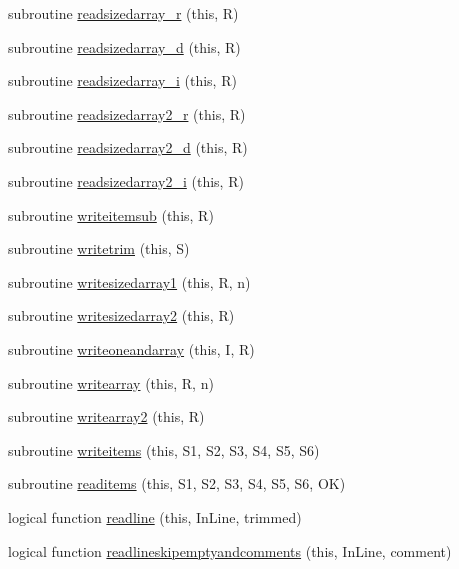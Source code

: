 \begin{DoxyCompactItemize}
subroutine \mbox{\hyperlink{namespacefileutils_a9d5d97346bddaa16024b5482cc1ce7cb}{readsizedarray\+\_\+r}} (this, R)
\item 
subroutine \mbox{\hyperlink{namespacefileutils_ab663b9fbd43f12bd0ad8fdda4c1ff85e}{readsizedarray\+\_\+d}} (this, R)
\item 
subroutine \mbox{\hyperlink{namespacefileutils_a767a096f95f5ccbb1c02deb7d926032b}{readsizedarray\+\_\+i}} (this, R)
\item 
subroutine \mbox{\hyperlink{namespacefileutils_a7fd8e6d80f0ccadb1d773d86d8871816}{readsizedarray2\+\_\+r}} (this, R)
\item 
subroutine \mbox{\hyperlink{namespacefileutils_a0057e2b91f8c173074b68aadbe1d3e92}{readsizedarray2\+\_\+d}} (this, R)
\item 
subroutine \mbox{\hyperlink{namespacefileutils_acd15bd801738b538b71b3216aaab95cc}{readsizedarray2\+\_\+i}} (this, R)
\item 
subroutine \mbox{\hyperlink{namespacefileutils_a57cd0a2cbc7978f19baaebb111cdbe1d}{writeitemsub}} (this, R)
\item 
subroutine \mbox{\hyperlink{namespacefileutils_afe12625f20868804aae9ff245b783baf}{writetrim}} (this, S)
\item 
subroutine \mbox{\hyperlink{namespacefileutils_a416e6d6a5f7a1dfc3da764788ecaac59}{writesizedarray1}} (this, R, n)
\item 
subroutine \mbox{\hyperlink{namespacefileutils_aae72a2f6c28cf65ba7b21cd90f399eeb}{writesizedarray2}} (this, R)
\item 
subroutine \mbox{\hyperlink{namespacefileutils_adf43b426efd6b01f81b673d3db3cd8d8}{writeoneandarray}} (this, I, R)
\item 
subroutine \mbox{\hyperlink{namespacefileutils_af7dad8ef48af586cc127b552cadeb999}{writearray}} (this, R, n)
\item 
subroutine \mbox{\hyperlink{namespacefileutils_aa3569bb8cce3d65a6a7e820571bba597}{writearray2}} (this, R)
\item 
subroutine \mbox{\hyperlink{namespacefileutils_a0a2890041ec846715c0990fc468b6be1}{writeitems}} (this, S1, S2, S3, S4, S5, S6)
\item 
subroutine \mbox{\hyperlink{namespacefileutils_add4cb070c36870fe26122c8b1802894b}{readitems}} (this, S1, S2, S3, S4, S5, S6, OK)
\item 
logical function \mbox{\hyperlink{namespacefileutils_affa8ee4edc46a1fcbc9da79877e80724}{readline}} (this, In\+Line, trimmed)
\item 
logical function \mbox{\hyperlink{namespacefileutils_a8adc28c1f4192183517beb41ccec4287}{readlineskipemptyandcomments}} (this, In\+Line, comment)

\end{DoxyCompactItemize}
